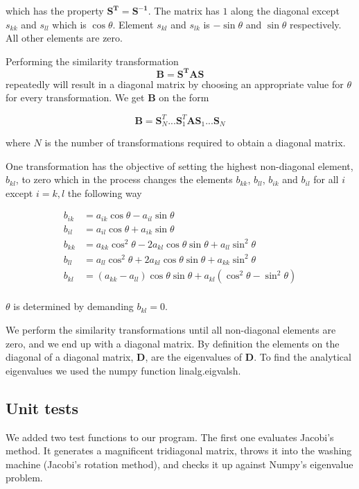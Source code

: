 \documentclass{article}
\begin{document}
which has the property $\mathbf{S^T}=\mathbf{S^{-1}}$. The matrix has $1$ along the diagonal except $s_{kk}$ and $s_{ll}$ which is $\cos\theta$. Element $s_{kl}$ and $s_{lk}$ is $-\sin\theta$ and $\sin\theta$ respectively. All other elements are zero.

Performing the similarity transformation
$$\mathbf{B}=\mathbf{S^TAS}$$
repeatedly will result in a diagonal matrix by choosing an appropriate value for $\theta$ for every transformation. We get $\mathbf{B}$ on the form

$$\mathbf{B}=\mathbf{S}^T_N...\mathbf{S}^T_1\mathbf{A}\mathbf{S}_1...\mathbf{S}_N$$

where $N$ is the number of transformations required to obtain a diagonal matrix.

One transformation has the objective of setting the highest non-diagonal element, $b_{kl}$, to zero which in the process changes the elements $b_{kk}$, $b_{ll}$, $b_{ik}$ and $b_{il}$ for all $i$ except $i=k,l$ the following way

\begin{equation*}
\begin{split}
b_{ik}&=a_{ik}\cos\theta-a_{il}\sin\theta\\
b_{il}&=a_{il}\cos\theta+a_{ik}\sin\theta\\
b_{kk}&=a_{kk}\cos^2\theta-2a_{kl}\cos\theta\sin\theta+a_{ll}\sin^2\theta\\
b_{ll}&=a_{ll}\cos^2\theta+2a_{kl}\cos\theta\sin\theta+a_{kk}\sin^2\theta\\
b_{kl}&=(a_{kk}-a_{ll})\cos\theta\sin\theta+a_{kl}(\cos^2\theta-\sin^2\theta)\\
\end{split}
\end{equation*}

$\theta$ is determined by demanding $b_{kl}=0$.

We perform the similarity transformations until all non-diagonal elements are zero, and we end up with a diagonal matrix. By definition the elements on the diagonal of a diagonal matrix, $\mathbf{D}$, are the eigenvalues of $\mathbf{D}$.
\vskip0.5cm
To find the analytical eigenvalues we used the numpy function linalg.eigvalsh.



\subsection{Unit tests}

We added two test functions to our program. The first one evaluates Jacobi's method. It generates a magnificent tridiagonal matrix, throws it into the washing machine (Jacobi's rotation method), and checks it up against Numpy's eigenvalue problem.
\end{document}
